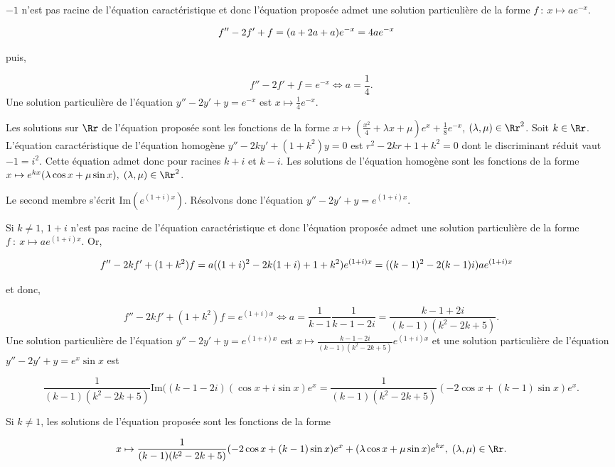 {{$-1$ n'est pas racine de l'équation caractéristique et donc
l'équation proposée admet une solution particulière de la forme $f~:~x\mapsto ae^{-x}$.

\begin{align*}\ensuremath
f''-2f'+f&=(a+2a+a)e^{-x}=4ae^{-x}
\end{align*}

puis,

$$f''-2f'+f=e^{-x}\Leftrightarrow a=\frac{1}{4}.$$
Une solution particulière de l'équation $y''-2y'+y=e^{-x}$ est $x\mapsto\frac{1}{4}e^{-x}$.

Les solutions sur $\Rr$ de l'équation proposée sont les fonctions de la forme
$x\mapsto(\frac{x^2}{4}+\lambda x+\mu)e^x+\frac{1}{8}e^{-x}$, $(\lambda,\mu)\in\Rr^2$.
Soit $k\in\Rr$. L'équation caractéristique de l'équation homogène $y''-2ky'+(1+k^2)y=0$ est $r^2-2kr+1+k^2=0$
dont le discriminant réduit vaut $-1=i^2$. Cette équation admet donc pour racines $k+i$ et $k-i$. Les solutions de
l'équation homogène sont les fonctions de la forme $x\mapsto e^{kx}(\lambda\cos x+\mu\sin x),\;(\lambda,\mu)\in\Rr^2$.

Le second membre s'écrit $\mbox{Im}(e^{(1+i)x})$. Résolvons donc l'équation $y''-2y'+y=e^{(1+i)x}$.

Si $k\neq1$, $1+i$ n'est pas racine de l'équation caractéristique et donc
l'équation proposée admet une solution particulière de la forme $f~:~x\mapsto ae^{(1+i)x}$. Or,

\begin{align*}\ensuremath
f''-2kf'+(1+k^2)f&=a((1+i)^2-2k(1+i)+1+k^2)e^{(1+i)x}=((k-1)^2-2(k-1)i)ae^{(1+i)x}
\end{align*}

et donc,

$$f''-2kf'+(1+k^2)f=e^{(1+i)x}\Leftrightarrow a=\frac{1}{k-1}\frac{1}{k-1-2i}=\frac{k-1+2i}{(k-1)(k^2-2k+5)}.$$
Une solution particulière de l'équation $y''-2y'+y=e^{(1+i)x}$ est $x\mapsto\frac{k-1-2i}{(k-1)(k^2-2k+5)}e^{(1+i)x}$
et une solution particulière de l'équation $y''-2y'+y=e^{x}\sin x$ est

$$\frac{1}{(k-1)(k^2-2k+5)}\mbox{Im}((k-1-2i)(\cos x+i\sin x)e^x=\frac{1}{(k-1)(k^2-2k+5)}(-2\cos x+(k-1)\sin x)e^x.$$

Si $k\neq1$, les solutions de l'équation proposée sont les fonctions de la forme

$$x\mapsto\frac{1}{(k-1)(k^2-2k+5)}(-2\cos x+(k-1)\sin x)e^x+(\lambda\cos x+\mu\sin x)e^{kx},\;(\lambda,\mu)\in\Rr.$$
}
}
